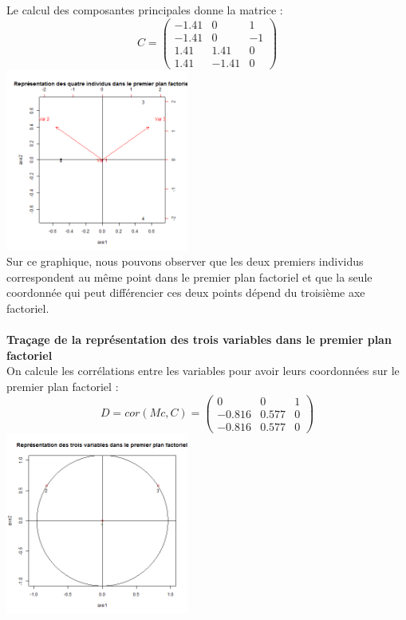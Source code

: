 \documentclass[a4paper, 8pt]{article}
\begin{document}
Le calcul des composantes principales donne la matrice :\\
\[C =
\begin{pmatrix}
-1.41 & 0 & 1\\
-1.41 & 0 & -1\\
1.41 & 1.41 & 0\\
1.41 & -1.41 & 0
\end{pmatrix}\]
\includegraphics[height = 6cm, width = 6cm]{plots/plot_composantes_principales.png}\\
Sur ce graphique, nous pouvons observer que les deux premiers individus correspondent au m\^eme point dans le premier plan factoriel
et que la seule coordonn\'ee qui peut diff\'erencier ces deux points d\'epend du troisi\`eme axe factoriel.\\ \\
\textbf{Traçage de la repr\'esentation des trois variables dans le premier plan factoriel}\\
On calcule les corr\'elations entre les variables pour avoir leurs coordonn\'ees sur le premier plan factoriel :\\
\[D = cor(Mc, C) =
\begin{pmatrix}
0 & 0 & 1\\
-0.816 & 0.577 & 0\\
-0.816 & 0.577 & 0
\end{pmatrix}\]
\includegraphics[height = 6cm, width = 6cm]{plots/plot_correlation.png}\\
\end{document}
